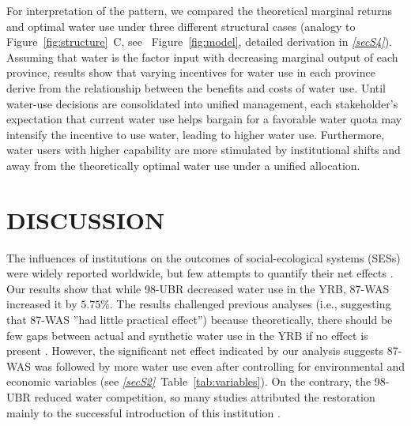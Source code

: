 \documentclass[default, sn-standardnature]{sn-jnl}
\begin{document}
For interpretation of the pattern, we compared the theoretical marginal returns and optimal water use under three different structural cases (analogy to Figure~\ref{fig:structure}~C, see ~Figure~\ref{fig:model}, detailed derivation in \textit{\ref{secS4}}).
Assuming that water is the factor input with decreasing marginal output of each province, results show that varying incentives for water use in each province derive from the relationship between the benefits and costs of water use.
Until water-use decisions are consolidated into unified management, each stakeholder’s expectation that current water use helps bargain for a favorable water quota may intensify the incentive to use water, leading to higher water use.
Furthermore, water users with higher capability are more stimulated by institutional shifts and away from the theoretically optimal water use under a unified allocation.


\section{DISCUSSION}\label{sec:discussion}

\label{discussion-1}
The influences of institutions on the outcomes of social-ecological systems (SESs) were widely reported worldwide, but few attempts to quantify their net effects \cite{cumming2020a}.
Our results show that while 98-UBR decreased water use in the YRB, 87-WAS increased it by $5.75\%$.
The results challenged previous analyses (i.e., suggesting that 87-WAS ''had little practical effect'') because theoretically, there should be few gaps between actual and synthetic water use in the YRB if no effect is present \cite{abadie2015,hill2021}.
However, the significant net effect indicated by our analysis suggests 87-WAS was followed by more water use even after controlling for environmental and economic variables (see \textit{\ref{secS2}}~Table~\ref{tab:variables}).
On the contrary, the 98-UBR reduced water competition, so many studies attributed the restoration mainly to the successful introduction of this institution \cite{chen2021,huangang2002,an2007}.
\end{document}
